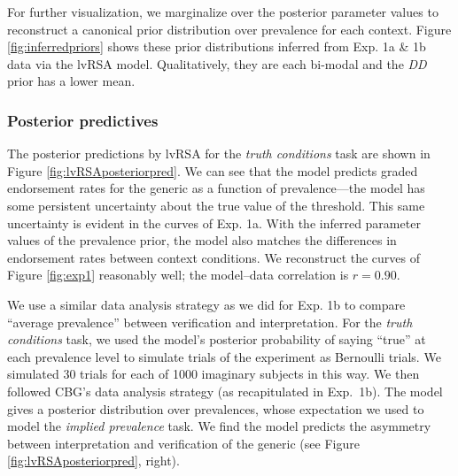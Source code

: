 \documentclass[10pt,letterpaper]{article}
\begin{document}
%

For further visualization, we marginalize over the posterior parameter values to reconstruct a canonical prior distribution over prevalence for each context. Figure \ref{fig:inferredpriors} shows these prior distributions inferred from Exp. 1a \& 1b data via the lvRSA model. 
Qualitatively, they are each bi-modal and the \emph{DD} prior has a lower mean.

\subsubsection{Posterior predictives}

The posterior predictions by lvRSA for the \emph{truth conditions} task are shown in Figure \ref{fig:lvRSAposteriorpred}. 
We can see that the model predicts graded endorsement rates for the generic as a function of prevalence---the model has some persistent uncertainty about the true value of the threshold. This same uncertainty is evident in the curves of Exp. 1a.
With the inferred parameter values of the prevalence prior, the model also matches the differences in endorsement rates between context conditions.
We reconstruct the curves of Figure \ref{fig:exp1} reasonably well; the model--data correlation is $r = 0.90$.


We use a similar data analysis strategy as we did for Exp. 1b to compare ``average prevalence'' between verification and interpretation. For the \emph{truth conditions} task, we used the model's posterior probability of saying ``true'' at each prevalence level to simulate trials of the experiment as Bernoulli trials. We simulated 30 trials for each of 1000 imaginary subjects in this way. We then followed CBG's data analysis strategy (as recapitulated in Exp.~1b). The model gives a posterior distribution over prevalences, whose expectation we used to model the \emph{implied prevalence} task. We find the model predicts the asymmetry between interpretation and verification of the generic (see Figure \ref{fig:lvRSAposteriorpred}, right).
\end{document}

